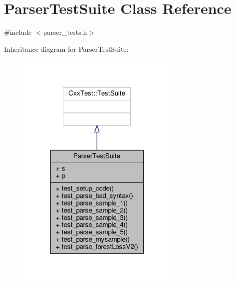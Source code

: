 \hypertarget{classParserTestSuite}{\section{Parser\-Test\-Suite Class Reference}
\label{classParserTestSuite}
}


{\ttfamily \#include $<$parser\-\_\-tests.\-h$>$}



Inheritance diagram for Parser\-Test\-Suite\-:\nopagebreak
\begin{figure}[H]
\begin{center}
\leavevmode
\includegraphics[width=220pt]{classParserTestSuite__inherit__graph}
\end{center}
\end{figure}


